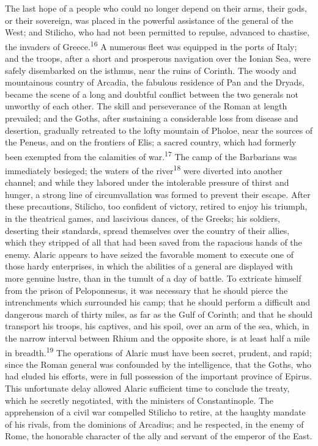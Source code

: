 The last hope of a people who could no longer depend on their
arms, their gods, or their sovereign, was placed in the powerful
assistance of the general of the West; and Stilicho, who had not
been permitted to repulse, advanced to chastise, the invaders of
Greece.\textsuperscript{16} A numerous fleet was equipped in the ports of Italy;
and the troops, after a short and prosperous navigation over the
Ionian Sea, were safely disembarked on the isthmus, near the
ruins of Corinth. The woody and mountainous country of Arcadia,
the fabulous residence of Pan and the Dryads, became the scene of
a long and doubtful conflict between the two generals not
unworthy of each other. The skill and perseverance of the Roman
at length prevailed; and the Goths, after sustaining a
considerable loss from disease and desertion, gradually retreated
to the lofty mountain of Pholoe, near the sources of the Peneus,
and on the frontiers of Elis; a sacred country, which had
formerly been exempted from the calamities of war.\textsuperscript{17} The camp of
the Barbarians was immediately besieged; the waters of the river\textsuperscript{18}
were diverted into another channel; and while they labored
under the intolerable pressure of thirst and hunger, a strong
line of circumvallation was formed to prevent their escape. After
these precautions, Stilicho, too confident of victory, retired to
enjoy his triumph, in the theatrical games, and lascivious
dances, of the Greeks; his soldiers, deserting their standards,
spread themselves over the country of their allies, which they
stripped of all that had been saved from the rapacious hands of
the enemy. Alaric appears to have seized the favorable moment to
execute one of those hardy enterprises, in which the abilities of
a general are displayed with more genuine lustre, than in the
tumult of a day of battle. To extricate himself from the prison
of Peloponnesus, it was necessary that he should pierce the
intrenchments which surrounded his camp; that he should perform a
difficult and dangerous march of thirty miles, as far as the Gulf
of Corinth; and that he should transport his troops, his
captives, and his spoil, over an arm of the sea, which, in the
narrow interval between Rhium and the opposite shore, is at least
half a mile in breadth.\textsuperscript{19} The operations of Alaric must have
been secret, prudent, and rapid; since the Roman general was
confounded by the intelligence, that the Goths, who had eluded
his efforts, were in full possession of the important province of
Epirus. This unfortunate delay allowed Alaric sufficient time to
conclude the treaty, which he secretly negotiated, with the
ministers of Constantinople. The apprehension of a civil war
compelled Stilicho to retire, at the haughty mandate of his
rivals, from the dominions of Arcadius; and he respected, in the
enemy of Rome, the honorable character of the ally and servant of
the emperor of the East.

